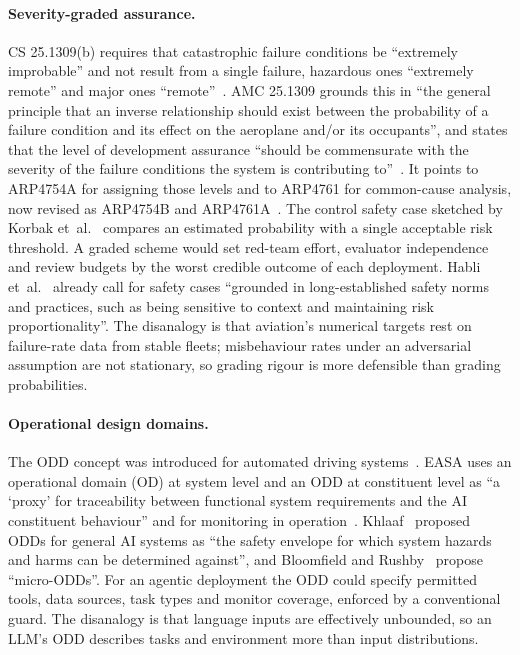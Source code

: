 \documentclass[11pt]{article}
\begin{document}
\paragraph{Severity-graded assurance.} CS 25.1309(b) requires that catastrophic failure conditions be ``extremely improbable'' and not result from a single failure, hazardous ones ``extremely remote'' and major ones ``remote''~\cite{easa2020cs25}. AMC 25.1309 grounds this in ``the general principle that an inverse relationship should exist between the probability of a failure condition and its effect on the aeroplane and/or its occupants'', and states that the level of development assurance ``should be commensurate with the severity of the failure conditions the system is contributing to''~\cite[paras.~6.a and~9.b(4)]{easa2021amc25}. It points to ARP4754A for assigning those levels and to ARP4761 for common-cause analysis, now revised as ARP4754B and ARP4761A~\cite{sae2023arp4754b,sae2023arp4761a}. The control safety case sketched by Korbak et~al.~\cite{korbak2025sketch} compares an estimated probability with a single acceptable risk threshold. A graded scheme would set red-team effort, evaluator independence and review budgets by the worst credible outcome of each deployment. Habli et~al.~\cite{habli2025big} already call for safety cases ``grounded in long-established safety norms and practices, such as being sensitive to context and maintaining risk proportionality''. The disanalogy is that aviation's numerical targets rest on failure-rate data from stable fleets; misbehaviour rates under an adversarial assumption are not stationary, so grading rigour is more defensible than grading probabilities.

\paragraph{Operational design domains.} The ODD concept was introduced for automated driving systems~\cite{khlaaf2023toward}. EASA uses an operational domain (OD) at system level and an ODD at constituent level as ``a `proxy' for traceability between functional system requirements and the AI constituent behaviour'' and for monitoring in operation~\cite[Section~B.5.2]{easa2026concept}. Khlaaf~\cite{khlaaf2023toward} proposed ODDs for general AI systems as ``the safety envelope for which system hazards and harms can be determined against'', and Bloomfield and Rushby~\cite{bloomfield2024assurance} propose ``micro-ODDs''. For an agentic deployment the ODD could specify permitted tools, data sources, task types and monitor coverage, enforced by a conventional guard. The disanalogy is that language inputs are effectively unbounded, so an LLM's ODD describes tasks and environment more than input distributions.
\end{document}
